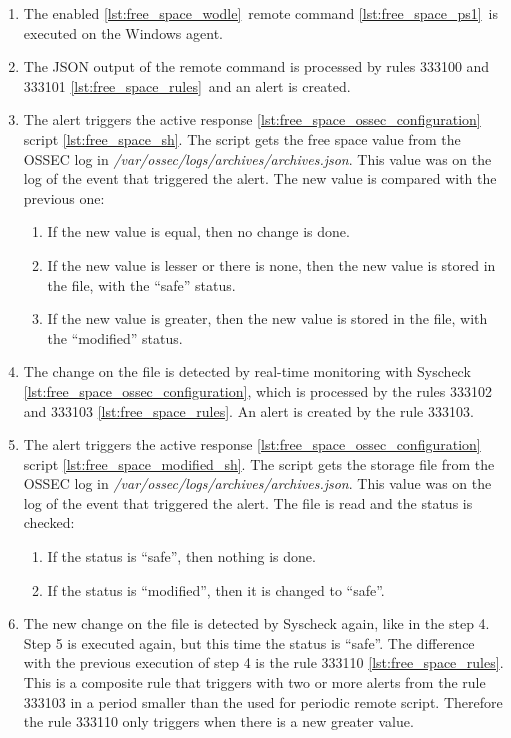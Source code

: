 \begin{enumerate}
	\item The enabled \ref{lst:free_space_wodle}\ remote command \ref{lst:free_space_ps1}\ is executed on the Windows agent.
	\item The JSON output of the remote command is processed by rules 333100 and 333101 \ref{lst:free_space_rules}\ and an alert is created.
	\item The alert triggers the active response \ref{lst:free_space_ossec_configuration} script \ref{lst:free_space_sh}. The script gets the free space value from the OSSEC log in \textit{/var/ossec/logs/archives/archives.json}. This value was on the log of the event that triggered the alert. The new value is compared with the previous one:
	\begin{enumerate}
		\item If the new value is equal, then no change is done.
		\item If the new value is lesser or there is none, then the new value is stored in the file, with the ``safe'' status.
		\item If the new value is greater, then the new value is stored in the file, with the ``modified'' status.
	\end{enumerate}
	\item The change on the file is detected by real-time monitoring with Syscheck \ref{lst:free_space_ossec_configuration}, which is processed by the rules 333102 and 333103 \ref{lst:free_space_rules}. An alert is created by the rule 333103.
	\item The alert triggers the active response \ref{lst:free_space_ossec_configuration} script \ref{lst:free_space_modified_sh}. The script gets the storage file from the OSSEC log in \textit{/var/ossec/logs/archives/archives.json}. This value was on the log of the event that triggered the alert. The file is read and the status is checked:
	\begin{enumerate}
		\item If the status is ``safe'', then nothing is done.
		\item If the status is ``modified'', then it is changed to ``safe''.
	\end{enumerate}
	\item The new change on the file is detected by Syscheck again, like in the step 4. Step 5 is executed again, but this time the status is ``safe''. The difference with the previous execution of step 4 is the rule 333110 \ref{lst:free_space_rules}. This is a composite rule that triggers with two or more alerts from the rule 333103 in a period smaller than the used for periodic remote script. Therefore the rule 333110 only triggers when there is a new greater value.
\end{enumerate}
